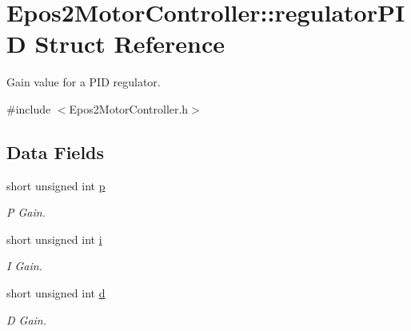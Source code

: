 \hypertarget{structEpos2MotorController_1_1regulatorPID}{\section{Epos2\-Motor\-Controller\-:\-:regulator\-P\-I\-D Struct Reference}
\label{structEpos2MotorController_1_1regulatorPID}
}


Gain value for a P\-I\-D regulator.  




{\ttfamily \#include $<$Epos2\-Motor\-Controller.\-h$>$}

\subsection*{Data Fields}
\begin{DoxyCompactItemize}
\item 
\hypertarget{structEpos2MotorController_1_1regulatorPID_ad51ff336927bfcfdc81c895ae296c846}{short unsigned int \hyperlink{structEpos2MotorController_1_1regulatorPID_ad51ff336927bfcfdc81c895ae296c846}{p}}\label{structEpos2MotorController_1_1regulatorPID_ad51ff336927bfcfdc81c895ae296c846}

\begin{DoxyCompactList}\small\item\em P Gain. \end{DoxyCompactList}\item 
\hypertarget{structEpos2MotorController_1_1regulatorPID_aa1e8852ec63ffd1be5620e410c9910d1}{short unsigned int \hyperlink{structEpos2MotorController_1_1regulatorPID_aa1e8852ec63ffd1be5620e410c9910d1}{i}}\label{structEpos2MotorController_1_1regulatorPID_aa1e8852ec63ffd1be5620e410c9910d1}

\begin{DoxyCompactList}\small\item\em I Gain. \end{DoxyCompactList}\item 
\hypertarget{structEpos2MotorController_1_1regulatorPID_a1590d8278e005b2a25969e197ed07ebb}{short unsigned int \hyperlink{structEpos2MotorController_1_1regulatorPID_a1590d8278e005b2a25969e197ed07ebb}{d}}\label{structEpos2MotorController_1_1regulatorPID_a1590d8278e005b2a25969e197ed07ebb}

\begin{DoxyCompactList}\small\item\em D Gain. \end{DoxyCompactList}\end{DoxyCompactItemize}
